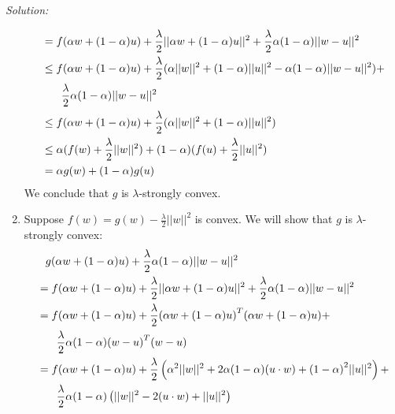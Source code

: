 \documentclass[
	10pt, %
	a4paper, %
	oneside, %
	headinclude,footinclude, %
	BCOR5mm, %
]{scrartcl}
\newenvironment{solution}
{\textit{Solution:}}
{}
\begin{document}
\begin{solution}
\begin{enumerate}[label= (\alph*)]
\begin{align*}
			       & = f(\alpha w + (1-\alpha)u) + \frac{\lambda}{2}||\alpha w + (1-\alpha) u||^2 + \frac{\lambda}{2}\alpha(1-\alpha)||w-u||^2 \\
			       & \leq f(\alpha w + (1-\alpha)u) + \frac{\lambda}{2}(\alpha||w||^2 + (1-\alpha)||u||^2 - \alpha(1-\alpha)||w-u||^2) +       \\
			       & \hphantom{\leq} \quad \frac{\lambda}{2}\alpha(1-\alpha)||w-u||^2                                                          \\
			       & \leq f(\alpha w + (1-\alpha)u) + \frac{\lambda}{2}(\alpha||w||^2 + (1-\alpha)||u||^2)                                     \\
			       & \leq \alpha (f(w) + \frac{\lambda}{2}||w||^2) + (1-\alpha)(f(u) + \frac{\lambda}{2}||u||^2)                               \\
			       & = \alpha g(w) + (1-\alpha)g(u)
		      \end{align*}
		      We conclude that $g$ is $\lambda$-strongly convex.
		\item Suppose $f(w) = g(w) - \frac{\lambda}{2}||w||^2$ is convex. We will show that $g$ is $\lambda$-strongly convex:
		      \begin{align*}
			       & \hphantom{=} g(\alpha w + (1-\alpha)u) + \frac{\lambda}{2}\alpha(1-\alpha)||w-u||^2                                                                                     \\
			       & = f(\alpha w + (1-\alpha)u) + \frac{\lambda}{2}||\alpha w + (1-\alpha) u||^2 + \frac{\lambda}{2}\alpha(1-\alpha)||w-u||^2                                               \\
			       & = f(\alpha w + (1-\alpha)u) + \frac{\lambda}{2}{(\alpha w + (1-\alpha) u)}^T(\alpha w + (1-\alpha) u) +                                                                 \\
			       & \hphantom{=} \quad \frac{\lambda}{2}\alpha(1-\alpha){(w-u)}^T(w-u)                                                                                                      \\
			       & = f(\alpha w + (1-\alpha)u) + \frac{\lambda}{2}\left(\alpha^2||w||^2+2\alpha(1-\alpha)(u\cdot w) + {(1-\alpha)}^2||u||^2\right) +                                       \\
			       & \hphantom{=} \quad\frac{\lambda}{2}\alpha(1-\alpha)\left(||w||^2 - 2(u\cdot w) + ||u||^2\right)                                                                         \\

\end{align*}
\end{enumerate}
\end{solution}
\end{document}
